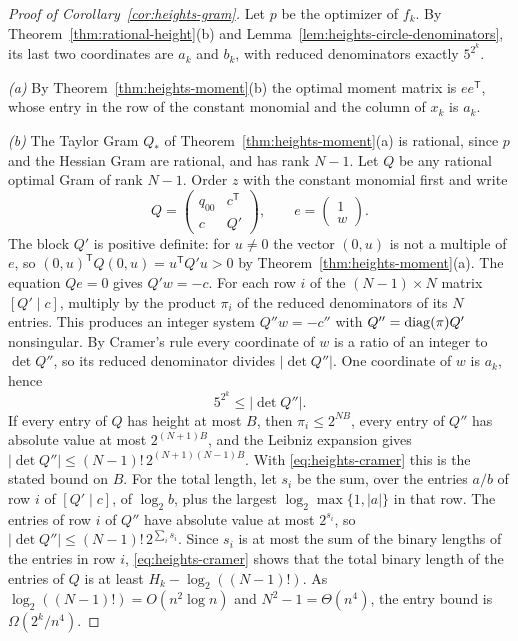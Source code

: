 \begin{proof}[Proof of Corollary~\ref{cor:heights-gram}]
Let $p$ be the optimizer of $f_k$. By Theorem~\ref{thm:rational-height}(b)
and Lemma~\ref{lem:heights-circle-denominators}, its last two coordinates are
$a_k$ and $b_k$, with reduced denominators exactly $5^{2^k}$.

\emph{(a)} By Theorem~\ref{thm:heights-moment}(b) the optimal moment matrix
is $ee^{\mathsf T}$, whose entry in the row of the constant monomial and the
column of $x_k$ is $a_k$.

\emph{(b)} The Taylor Gram $Q_*$ of Theorem~\ref{thm:heights-moment}(a) is
rational, since $p$ and the Hessian Gram are rational, and has rank $N-1$.
Let $Q$ be any rational optimal Gram of rank $N-1$. Order $z$ with the
constant monomial first and write
\[
 Q=\begin{pmatrix}q_{00}&c^{\mathsf T}\\c&Q'\end{pmatrix},
 \qquad e=\begin{pmatrix}1\\w\end{pmatrix}.
\]
The block $Q'$ is positive definite: for $u\ne0$ the vector $(0,u)$ is not a
multiple of $e$, so $(0,u)^{\mathsf T}Q(0,u)=u^{\mathsf T}Q'u>0$ by
Theorem~\ref{thm:heights-moment}(a). The equation $Qe=0$ gives $Q'w=-c$. For
each row $i$ of the $(N-1)\times N$ matrix $[Q'\mid c]$, multiply by the
product $\pi_i$ of the reduced denominators of its $N$ entries. This produces
an integer system $Q''w=-c''$ with $Q''=\operatorname{diag}(\pi)Q'$ nonsingular. By
Cramer's rule every coordinate of $w$ is a ratio of an integer to
$\det Q''$, so its reduced denominator divides $|\det Q''|$. One coordinate
of $w$ is $a_k$, hence
\begin{equation}
 5^{2^k}\le|\det Q''| .
 \label{eq:heights-cramer}
\end{equation}
If every entry of $Q$ has height at most $B$, then $\pi_i\le2^{NB}$, every
entry of $Q''$ has absolute value at most $2^{(N+1)B}$, and the Leibniz
expansion gives $|\det Q''|\le(N-1)!\,2^{(N+1)(N-1)B}$. With
\eqref{eq:heights-cramer} this is the stated bound on $B$. For the total
length, let $s_i$ be the sum, over the entries $a/b$ of row $i$ of
$[Q'\mid c]$, of $\log_2b$, plus the largest $\log_2\max\{1,|a|\}$ in that
row. The entries of row $i$ of $Q''$ have absolute value at most $2^{s_i}$, so
$|\det Q''|\le(N-1)!\,2^{\sum_is_i}$. Since $s_i$ is at most the sum of the
binary lengths of the entries in row $i$, \eqref{eq:heights-cramer} shows that
the total binary length of the entries of $Q$ is at least
$H_k-\log_2((N-1)!)$. As $\log_2((N-1)!)=O(n^2\log n)$ and
$N^2-1=\Theta(n^4)$, the entry bound is $\Omega(2^k/n^4)$.


\end{proof}
